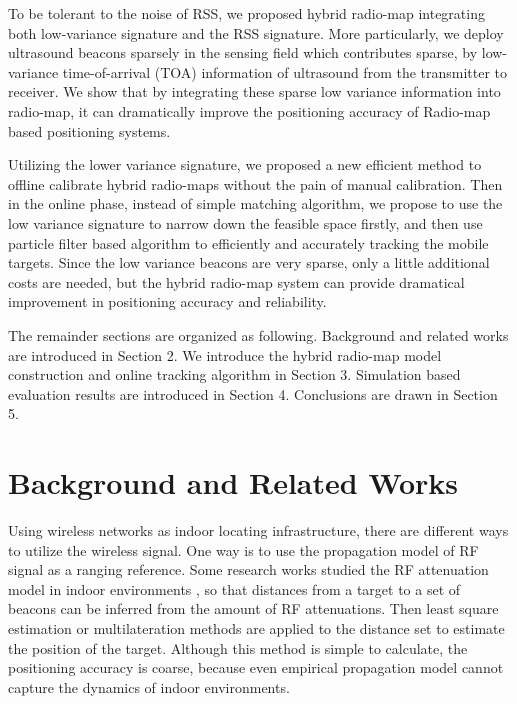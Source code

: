 \documentclass[conference, 10pt]{IEEEtran}
\begin{document}
To be tolerant to the noise of RSS, we proposed hybrid radio-map integrating both low-variance signature and the RSS signature. More particularly, we deploy ultrasound beacons sparsely in the sensing field which contributes sparse, by low-variance time-of-arrival (TOA) information of ultrasound from the transmitter to receiver. We show that by integrating these sparse low variance information into radio-map, it can dramatically improve the positioning accuracy of Radio-map based positioning systems.  

Utilizing the lower variance signature, we proposed a new efficient method to offline calibrate  hybrid radio-maps without the pain of manual calibration.  Then in the online phase, instead of simple matching algorithm, we propose to use the low variance signature to narrow down the feasible space firstly, and then use particle filter based algorithm to efficiently and accurately tracking the mobile targets. Since the low variance beacons are very sparse, only a little additional costs are needed, but the hybrid radio-map system can provide dramatical improvement in positioning accuracy and reliability. 

The remainder sections are organized as following. Background and related works are introduced in Section 2. We introduce the hybrid radio-map model construction and online tracking algorithm in Section 3. Simulation based evaluation results are introduced in Section 4. Conclusions are drawn in Section 5.  

\section{Background and Related Works}
Using wireless networks as indoor locating infrastructure, there are different ways to utilize the wireless signal. One way is to use the propagation model of RF signal as a ranging reference. Some research works studied the RF attenuation model in indoor environments \cite{el-kafrawy_propagation_2010}, so that distances from a target to a set of beacons can be inferred from the amount of RF attenuations. Then least square estimation or multilateration methods \cite{han_localization_2013} are applied to the distance set to estimate the position of the target. Although this method is simple to calculate, the positioning accuracy is coarse,  because even empirical propagation model cannot capture the dynamics of indoor environments.     
\end{document}

